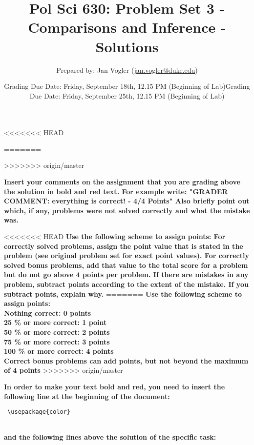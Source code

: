\documentclass[12pt,letter]{article}\usepackage[]{graphicx}\usepackage[]{color}
\begin{document}
\title{Pol Sci 630: Problem Set 3 - Comparisons and Inference - Solutions}

\author{Prepared by: Jan Vogler (\href{mailto:jan.vogler@duke.edu}{jan.vogler@duke.edu})}

<<<<<<< HEAD
\date{Grading Due Date: Friday, September 18th, 12.15 PM (Beginning of Lab)}
 
=======
\date{Grading Due Date: Friday, September 25th, 12.15 PM (Beginning of Lab)}

>>>>>>> origin/master
\maketitle

\textbf{\color{red} Insert your comments on the assignment that you are grading above the solution in bold and red text. For example write: "GRADER COMMENT: everything is correct! - 4/4 Points" Also briefly point out which, if any, problems were not solved correctly and what the mistake was.}

\bigskip

<<<<<<< HEAD
\textbf{Use the following scheme to assign points: For correctly solved problems, assign the point value that is stated in the problem (see original problem set for exact point values). For correctly solved bonus problems, add that value to the total score for a problem but do not go above 4 points per problem. If there are mistakes in any problem, subtract points according to the extent of the mistake. If you subtract points, explain why.}
=======
\textbf{Use the following scheme to assign points: \\
Nothing correct: 0 points \\
25 \% or more correct: 1 point \\
50 \% or more correct: 2 points \\
75 \% or more correct: 3 points \\
100 \% or more correct: 4 points \\
Correct bonus problems can add points, but not beyond the maximum of 4 points}
>>>>>>> origin/master

\bigskip

\textbf{In order to make your text bold and red, you need to insert the following line at the beginning of the document:}

\begin{verbatim} \usepackage{color} \end{verbatim}

\\ \textbf{and the following lines above the solution of the specific task:}
\end{document}
